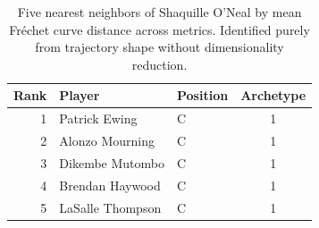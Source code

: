 \begin{table}[htbp]
  \centering\small
  \begin{tabular}{rllc}
    \toprule
    Rank & Player & Position & Archetype \\
    \midrule
    1 & Patrick Ewing & C & 1 \\
    2 & Alonzo Mourning & C & 1 \\
    3 & Dikembe Mutombo & C & 1 \\
    4 & Brendan Haywood & C & 1 \\
    5 & LaSalle Thompson & C & 1 \\
    \bottomrule
  \end{tabular}
  \caption{Five nearest neighbors of Shaquille O'Neal by mean Fr\'{e}chet curve distance across metrics. Identified purely from trajectory shape without dimensionality reduction.}
  \label{tab:Shaquille_O_Neal_frechet_curve_neighbors}
\end{table}

